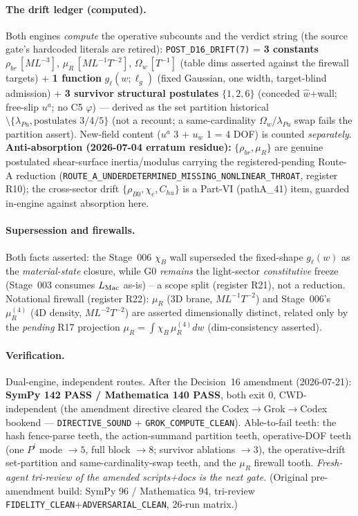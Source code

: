 \paragraph{The drift ledger (computed).}
Both engines \emph{compute} the operative subcounts and the verdict string (the
source gate's hardcoded literals are retired): \texttt{POST\_D16\_DRIFT(7)} =
\textbf{3 constants} \(\rho_{br}\,[ML^{-3}]\), \(\mu_R\,[ML^{-1}T^{-2}]\),
\(\Omega_w\,[T^{-1}]\) (table dims asserted against the firewall targets) +
\textbf{1 function} \(g_\ell(w;\ell_g)\) (fixed Gaussian, one width, target-blind
admission) + \textbf{3 survivor structural postulates} \(\{1,2,6\}\) (conceded
\(\hat w\)+wall; free-slip \(u^a\); no C5 \(\varphi\)) --- derived as the set
partition historical\(\setminus\{\lambda_{Pu},\text{postulates }3/4/5\}\) (not a
recount; a same-cardinality \(\Omega_w\)/\(\lambda_{Pu}\) swap fails the partition
assert). New-field content (\(u^a\) 3 + \(u_w\) 1 = 4 DOF) is counted
\emph{separately}. \textbf{Anti-absorption (2026-07-04 erratum residue):}
\(\{\rho_{br},\mu_R\}\) are genuine postulated shear-surface inertia/modulus
carrying the registered-pending Route-A reduction
(\texttt{ROUTE\_A\_UNDERDETERMINED\_MISSING\_NONLINEAR\_THROAT}, register R10);
the cross-sector drift \(\{\rho_{B0},\chi_c,C_{hu}\}\) is a Part-VI (pathA\_41)
item, guarded in-engine against absorption here.

\paragraph{Supersession and firewalls.}
Both facts asserted: the Stage~006 \(\chi_B\) wall superseded the fixed-shape
\(g_\ell(w)\) as the \emph{material-state} closure, while G0 \emph{remains} the
light-sector \emph{constitutive} freeze (Stage~003 consumes \(L_{\rm Mac}\)
as-is) -- a scope split (register R21), not a reduction. Notational firewall
(register R22): \(\mu_R\) (3D brane, \(ML^{-1}T^{-2}\)) and Stage~006's
\(\mu_R^{(4)}\) (4D density, \(ML^{-2}T^{-2}\)) are asserted dimensionally
distinct, related only by the \emph{pending} R17 projection
\(\mu_R=\int\chi_B\,\mu_R^{(4)}dw\) (dim-consistency asserted).

\paragraph{Verification.}
Dual-engine, independent routes. After the Decision~16 amendment (2026-07-21):
\textbf{SymPy 142 PASS / Mathematica 140 PASS}, both exit 0, CWD-independent
(the amendment directive cleared the Codex\(\to\)Grok\(\to\)Codex bookend ---
\texttt{DIRECTIVE\_SOUND} + \texttt{GROK\_COMPUTE\_CLEAN}). Able-to-fail teeth:
the hash fence-parse teeth, the action-summand partition teeth, operative-DOF
teeth (one \(P^i\) mode \(\to5\), full block \(\to8\); survivor ablations
\(\to3\)), the operative-drift set-partition and same-cardinality-swap teeth, and
the \(\mu_R\) firewall tooth. \emph{Fresh-agent tri-review of the amended
scripts+docs is the next gate.} (Original pre-amendment build: SymPy 96 /
Mathematica 94, tri-review \texttt{FIDELITY\_CLEAN}+\texttt{ADVERSARIAL\_CLEAN},
26-run matrix.)
